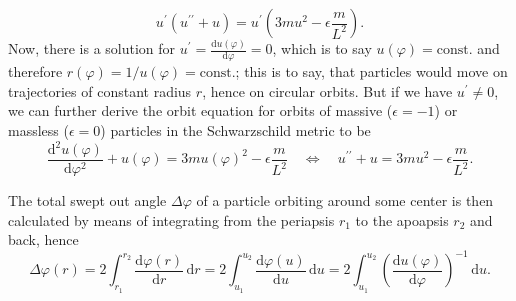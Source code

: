 \documentclass[a4paper,11pt]{article}
\numberwithin{equation}{section}
\begin{document}
{\begin{equation}
u^\prime(u^{\prime\prime}+u) = u^\prime\left(3mu^2-\epsilon\frac{ m}{L^2}\right).
\end{equation} Now, there is a solution for $u^\prime = \frac{\mathrm{d}u(\varphi)}{\mathrm{d}\varphi} = 0$, which is to say $u(\varphi) = \text{const.}$ and therefore $r(\varphi) = 1/u(\varphi) = \text{const.}$; this is to say, that particles would move on trajectories of constant radius $r$, hence on circular orbits. But if we have $u^{\prime} \neq 0$, we can further derive the orbit equation for orbits of massive ($\epsilon = -1$) or massless ($\epsilon = 0$) particles in the Schwarzschild metric to be \begin{equation}
\frac{\mathrm{d}^2u(\varphi)}{\mathrm{d}\varphi^2} + u(\varphi) = 3mu(\varphi)^2 - \epsilon\frac{m}{L^2} \quad \Leftrightarrow \quad u^{\prime\prime} + u = 3mu^2 - \epsilon \frac{m}{L^2}.
\end{equation}

The total swept out angle $\Delta \varphi$ of a particle orbiting around some center is then calculated by means of integrating from the periapsis $r_1$ to the apoapsis $r_2$ and back, hence \begin{equation}
\Delta \varphi(r) = 2\int_{r_1}^{r_2}\frac{\mathrm{d}\varphi(r)}{\mathrm{d}r}\,\mathrm{d}r = 2\int_{u_1}^{u_2}\frac{\mathrm{d}\varphi(u)}{\mathrm{d}u}\,\mathrm{d}u = 2\int_{u_1}^{u_2} \left(\frac{\mathrm{d}u(\varphi)}{\mathrm{d}\varphi}\right)^{-1}\,\mathrm{d}u.
\end{equation}
}
\end{document}
